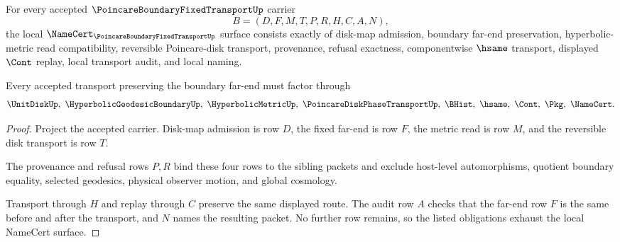 \begin{theorem}
\label{thm:poincare-boundary-fixed-transport-namecert-obligations}
For every accepted $\PoincareBoundaryFixedTransportUp$ carrier
$$
B=(D,F,M,T,P,R,H,C,A,N),
$$
the local $\NameCert_{\PoincareBoundaryFixedTransportUp}$ surface consists exactly of disk-map admission, boundary far-end preservation, hyperbolic-metric read compatibility, reversible Poincare-disk transport, provenance, refusal exactness, componentwise $\hsame$ transport, displayed $\Cont$ replay, local transport audit, and local naming.

Every accepted transport preserving the boundary far-end must factor through
$$
\UnitDiskUp,\ \HyperbolicGeodesicBoundaryUp,\ \HyperbolicMetricUp,\ \PoincareDiskPhaseTransportUp,\ \BHist,\ \hsame,\ \Cont,\ \Pkg,\ \NameCert .
$$
\end{theorem}
\begin{proof}
Project the accepted carrier. Disk-map admission is row $D$, the fixed far-end is row $F$, the metric read is row $M$, and the reversible disk transport is row $T$.

The provenance and refusal rows $P,R$ bind these four rows to the sibling packets and exclude host-level automorphisms, quotient boundary equality, selected geodesics, physical observer motion, and global cosmology.

Transport through $H$ and replay through $C$ preserve the same displayed route. The audit row $A$ checks that the far-end row $F$ is the same before and after the transport, and $N$ names the resulting packet. No further row remains, so the listed obligations exhaust the local NameCert surface.
\end{proof}




